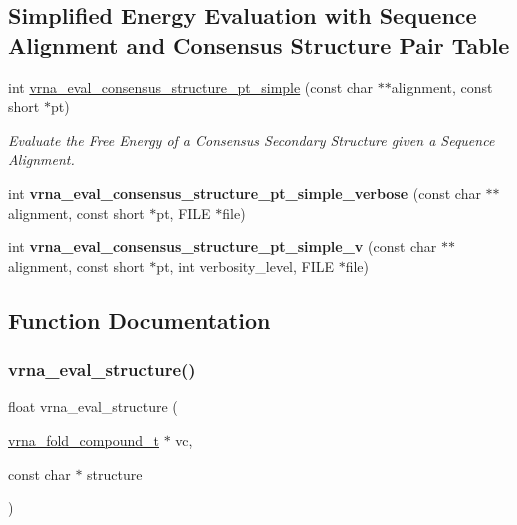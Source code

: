 \subsection*{Simplified Energy Evaluation with Sequence Alignment and Consensus Structure Pair Table}
\begin{DoxyCompactItemize}
\item 
int \hyperlink{group__eval_gabbb4d2a7aa324ec9cce8f47ce61ab8af}{vrna\+\_\+eval\+\_\+consensus\+\_\+structure\+\_\+pt\+\_\+simple} (const char $\ast$$\ast$alignment, const short $\ast$pt)
\begin{DoxyCompactList}\small\item\em Evaluate the Free Energy of a Consensus Secondary Structure given a Sequence Alignment. \end{DoxyCompactList}\item 
\mbox{\label{group__eval_ga2769e4369d023ad2d5c5f4d2ee825c23}} 
int {\bfseries vrna\+\_\+eval\+\_\+consensus\+\_\+structure\+\_\+pt\+\_\+simple\+\_\+verbose} (const char $\ast$$\ast$alignment, const short $\ast$pt, F\+I\+LE $\ast$file)
\item 
\mbox{\label{group__eval_gaf2d227b3d54bf9b693a3df52faf5e2e4}} 
int {\bfseries vrna\+\_\+eval\+\_\+consensus\+\_\+structure\+\_\+pt\+\_\+simple\+\_\+v} (const char $\ast$$\ast$alignment, const short $\ast$pt, int verbosity\+\_\+level, F\+I\+LE $\ast$file)
\end{DoxyCompactItemize}


\subsection{Function Documentation}
\mbox{\label{group__eval_ga58f199f1438d794a265f3b27fc8ea631}} 
\subsubsection{\texorpdfstring{vrna\+\_\+eval\+\_\+structure()}{vrna\_eval\_structure()}}
{\footnotesize\ttfamily float vrna\+\_\+eval\+\_\+structure (\begin{DoxyParamCaption}\item[{\hyperlink{group__fold__compound_ga1b0cef17fd40466cef5968eaeeff6166}{vrna\+\_\+fold\+\_\+compound\+\_\+t} $\ast$}]{vc,  }\item[{const char $\ast$}]{structure }\end{DoxyParamCaption})}



